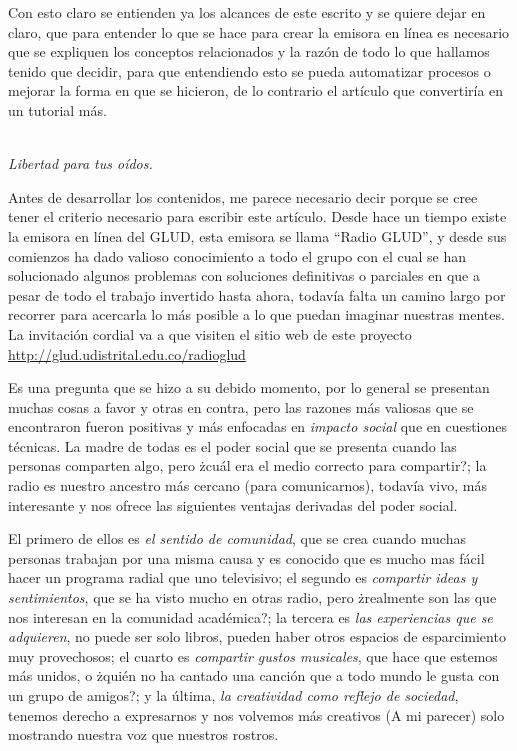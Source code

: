 \begin{multicols}{2}
Con esto claro se entienden ya los alcances de este escrito y se quiere dejar en claro, que para entender lo que se hace para crear la emisora en línea es necesario que se expliquen los conceptos relacionados y la razón de todo lo que hallamos tenido que decidir, para que entendiendo esto se pueda automatizar procesos o mejorar la forma en que se hicieron, de lo contrario el artículo que convertiría en un tutorial más.

\begin{entradilla} %
{\em {\color{introcolor}{Radio GLUD}} \\ Libertad para tus oídos.}
\end{entradilla}

Antes de desarrollar los contenidos, me parece necesario decir porque se cree tener el criterio necesario para escribir este artículo. Desde hace un tiempo existe la emisora en línea del GLUD, esta emisora se llama ``Radio GLUD'', y desde sus comienzos ha dado valioso conocimiento a todo el grupo con el cual se han solucionado algunos problemas con soluciones definitivas o parciales en que a pesar de todo el trabajo invertido hasta ahora, todavía falta un camino largo por recorrer para acercarla lo más posible a lo que puedan imaginar nuestras mentes.
La invitación cordial va a que visiten el sitio web de este proyecto \url{http://glud.udistrital.edu.co/radioglud}


Es una pregunta que se hizo a su debido momento, por lo general se presentan muchas cosas a favor y otras en contra, pero las razones más valiosas que se encontraron fueron positivas y más enfocadas en {\em impacto social} que en cuestiones técnicas. La madre de todas es el poder social que se presenta cuando las personas comparten algo, pero żcuál era el medio correcto para compartir?; la radio es nuestro ancestro más cercano (para comunicarnos), todavía vivo, más interesante y nos ofrece las siguientes ventajas derivadas del poder social.

El primero de ellos es {\em el sentido de comunidad}, que se crea cuando muchas personas trabajan por una misma causa y es conocido que es mucho mas fácil hacer un programa radial que uno televisivo; el segundo es {\em compartir ideas y sentimientos}, que se ha visto mucho en otras radio, pero żrealmente son las que nos interesan en la comunidad académica?; la tercera es {\em las experiencias que se adquieren}, no puede ser solo libros, pueden haber otros espacios de esparcimiento muy provechosos; el cuarto es {\em compartir gustos musicales}, que hace que estemos más unidos, o żquién no ha cantado una canción que a todo mundo le gusta con un grupo de amigos?; y la última, {\em la creatividad como reflejo de sociedad}, tenemos derecho a expresarnos y nos volvemos más creativos (A mi parecer) solo mostrando nuestra voz que nuestros rostros.


\end{multicols}
